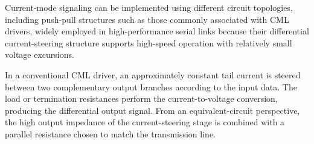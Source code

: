 Current-mode signaling can be implemented using different circuit topologies, including push-pull structures such as those commonly associated with \ac{CML} drivers, widely employed in high-performance serial links because their differential current-steering structure supports high-speed operation with relatively small voltage excursions.

In a conventional \ac{CML} driver, an approximately constant tail current is steered between two complementary output branches according to the input data. The load or termination resistances perform the current-to-voltage conversion, producing the differential output signal. From an equivalent-circuit perspective, the high output impedance of the current-steering stage is combined with a parallel resistance chosen to match the transmission line.

